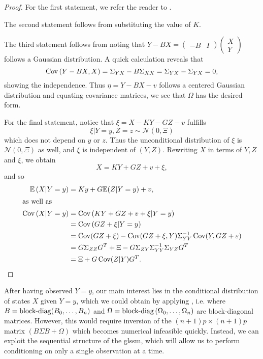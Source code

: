 \begin{proof}
    For the first statement, we refer the reader to \citep[Chapter 4, Lemma 1]{Durbin2012Time}.
    
    The second statement follows from substituting the value of $K$. 
    
    The third statement follows from noting that $Y-BX = \begin{pmatrix}
        -B & I
    \end{pmatrix} \begin{pmatrix}
        X \\ Y
    \end{pmatrix}$ follows a Gaussian distribution. A quick calculation reveals that $$\operatorname{Cov} \left( Y- BX, X \right) = \Sigma_{YX} - B \Sigma_{XX} = \Sigma_{YX} - \Sigma_{YX} = 0,$$
    showing the independence. Thus $\eta = Y - BX - v$ follows a centered Gaussian distribution and equating covariance matrices, we see that $\Omega$ has the desired form.

    For the final statement, notice that $\xi = X - KY - GZ - v$ fulfills 
    $$
    \xi | Y = y, Z = z \sim \mathcal N(0, \Xi)
    $$
    which does not depend on $y$ or $z$. Thus the unconditional distribution of $\xi$ is $\mathcal N(0, \Xi)$ as well, and $\xi$ is independent of $(Y, Z)$. Rewriting $X$ in terms of $Y,Z$ and $\xi$, we obtain 
    $$
    X = KY + GZ + v + \xi,
    $$
    and so
    \begin{align*}
        \mathbb E \left( X | Y = y \right) &= Ky + G \mathbb E (Z| Y = y) + v,\\
        \intertext{as well as}
        \operatorname{Cov} \left( X | Y = y \right) &= \operatorname{Cov} \left(KY + GZ+v +\xi|  Y = y\right) \\
            &= \operatorname{Cov} \left( GZ + \xi | Y = y  \right) \\
            &= \operatorname{Cov} (GZ + \xi) - \operatorname{Cov}(GZ + \xi, Y) \Sigma_{YY}^{-1} \operatorname{Cov} (Y, GZ + \varepsilon)\\
            &= G \Sigma_{ZZ}G^{T} + \Xi - G \Sigma_{ZY}\Sigma_{YY}^{-1}\Sigma_{YZ}G^{T}\\
            &= \Xi + G \operatorname{Cov}(Z|Y) G^{T}.
    \end{align*}
\end{proof}

After having observed $Y = y$, our main interest lies in the conditional distribution of states $X$ given $Y= y$, which we could obtain by applying , i.e. where $B = \operatorname{block-diag} (B_{0}, \dots, B_{n})$ and $\Omega = \operatorname{block-diag} \left( \Omega_{0}, \dots, \Omega_{n} \right)$ are block-diagonal matrices. However, this would require inversion of the $(n+1)p\times(n+1)p$ matrix $\left( B\Sigma B + \Omega \right)$ which becomes numerical infeasible quickly. Instead, we can exploit the sequential structure of the \acrshort{glssm}, which will allow us to perform conditioning on only a single observation at a time. 

